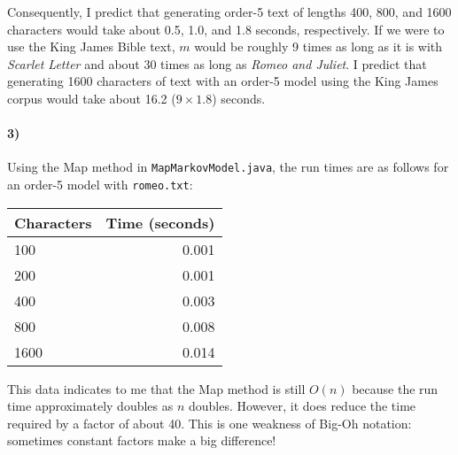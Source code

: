 \documentclass[12pt]{article}
\begin{document}
Consequently, I predict that generating order-5 text of lengths 400, 800, and 1600 characters would take about 0.5, 1.0, and 1.8 seconds, respectively. If we were to use the King James Bible text, $m$ would be roughly 9 times as long as it is with \emph{Scarlet Letter} and about 30 times as long as \emph{Romeo and Juliet}. I predict that generating 1600 characters of text with an order-5 model using the King James corpus would take about 16.2 ($9\times1.8$) seconds. 

\paragraph{3)} Using the Map method in \texttt{MapMarkovModel.java}, the run times are as follows for an order-5 model with \texttt{romeo.txt}:

\begin{table}[h]
\begin{center}
\begin{tabular}{lr}
Characters & Time (seconds) \\
\hline
100 & 0.001 \\
200 & 0.001\\
400 & 0.003 \\
800 & 0.008 \\
1600 & 0.014 \\
\end{tabular}
\end{center}
\end{table}

This data indicates to me that the Map method is still $O(n)$ because the run time approximately doubles as $n$ doubles. However, it does reduce the time required by a factor of about 40. This is one weakness of Big-Oh notation: sometimes constant factors make a big difference! 
\end{document}
